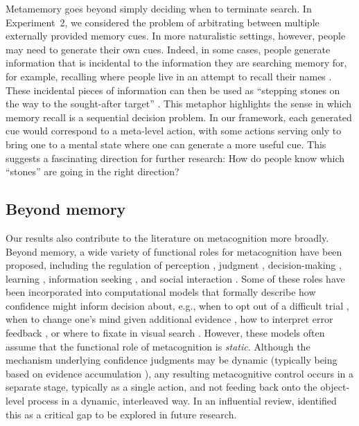 Metamemory goes beyond simply deciding when to terminate search. In Experiment~2, we considered the problem of arbitrating between multiple externally provided memory cues. In more naturalistic settings, however, people may need to generate their own cues. Indeed, in some cases, people generate information that is incidental to the information they are searching memory for, for example, recalling where people live in an attempt to recall their names \citep{williams1981process}. These incidental pieces of information can then be used as ``stepping stones on the way to the sought-after target'' \citep[p. 334]{koriat2000control}. This metaphor highlights the sense in which memory recall is a sequential decision problem. In our framework, each generated cue would correspond to a meta-level action, with some actions serving only to bring one to a mental state where one can generate a more useful cue. This suggests a fascinating direction for further research: How do people know which ``stones'' are going in the right direction?

\subsection{Beyond memory}

Our results also contribute to the literature on metacognition more broadly. Beyond memory, a wide variety of functional roles for metacognition have been proposed, including the regulation of perception \citep{deroy2016metacognition}, judgment \citep{polania2019efficient,lebreton2015automatic}, decision-making \citep{yeung2012metacognition,demartino2013confidence}, learning \citep{fromer2021expectations,nassar2012rational}, information seeking \citep{boldt2019confidence,desender2018subjective}, and social interaction \citep{frith2012role}. Some of these roles have been incorporated into computational models that formally describe how confidence might inform decision about, e.g., when to opt out of a difficult trial \citep{kiani2009representation}, when to change one's mind given additional evidence \citep{folke2016explicit}, how to interpret error feedback \citep{fromer2021expectations}, or where to fixate in visual search \citep{stewart2022humans}. However, these models often assume that the functional role of metacognition is \emph{static}. Although the mechanism underlying confidence judgments may be dynamic (typically being based on evidence accumulation \citealp{vickers1970evidence,pleskac2010twostage,moreno-bote2010decision}), any resulting metacognitive control occurs in a separate stage, typically as a single action, and not feeding back onto the object-level process in a dynamic, interleaved way. In an influential review, \citet{yeung2012metacognition} identified this as a critical gap to be explored in future research.

